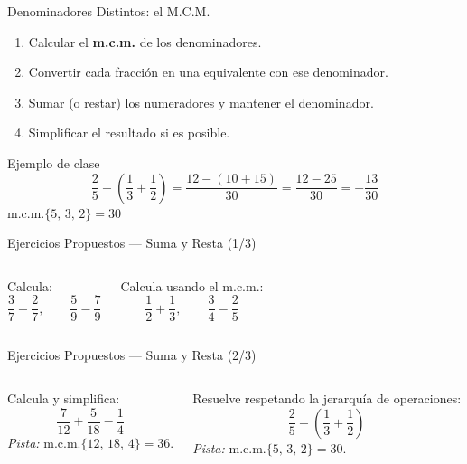 \documentclass[aspectratio=169]{beamer}
\begin{document}
\begin{frame}{Denominadores Distintos: el M.C.M.}
  \begin{mwpasos}[Procedimiento]
    \begin{enumerate}
      \item Calcular el \textbf{m.c.m.} de los denominadores.
      \item Convertir cada fracción en una equivalente con ese
            denominador.
      \item Sumar (o restar) los numeradores y mantener el
            denominador.
      \item Simplificar el resultado si es posible.
    \end{enumerate}
  \end{mwpasos}
  \vspace{4pt}
  \begin{exampleblock}{Ejemplo de clase}
    \[
      \frac{2}{5} - \left(\frac{1}{3} + \frac{1}{2}\right)
      = \frac{12 - (10 + 15)}{30}
      = \frac{12 - 25}{30}
      = -\frac{13}{30}
    \]
    $\text{m.c.m.}\{5,\, 3,\, 2\} = 30$
  \end{exampleblock}
\end{frame}

\begin{frame}{Ejercicios Propuestos — Suma y Resta \textnormal{(1/3)}}
  \begin{columns}[T]
    \begin{mwejercicio}
      Calcula:
      \[
        \frac{3}{7} + \frac{2}{7},
        \qquad
        \frac{5}{9} - \frac{7}{9}
      \]
    \end{mwejercicio}
    \begin{mwejercicio}
      Calcula usando el m.c.m.:
      \[
        \frac{1}{2} + \frac{1}{3},
        \qquad
        \frac{3}{4} - \frac{2}{5}
      \]
    \end{mwejercicio}
  \end{columns}
\end{frame}

\begin{frame}{Ejercicios Propuestos — Suma y Resta \textnormal{(2/3)}}
  \begin{columns}[T]
    \begin{mwejercicio}
      Calcula y simplifica:
      \[
        \frac{7}{12} + \frac{5}{18} - \frac{1}{4}
      \]
      \textit{Pista:} $\text{m.c.m.}\{12,\, 18,\, 4\} = 36$.
    \end{mwejercicio}
    \begin{mwejercicio}
      Resuelve respetando la jerarquía de operaciones:
      \[
        \frac{2}{5} - \left(\frac{1}{3} + \frac{1}{2}\right)
      \]
      \textit{Pista:} $\text{m.c.m.}\{5,\, 3,\, 2\} = 30$.
    \end{mwejercicio}
  \end{columns}
\end{frame}
\end{document}
